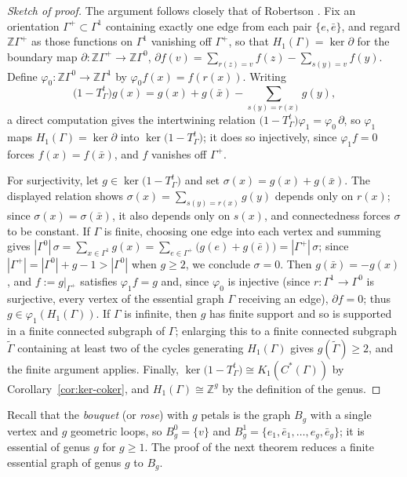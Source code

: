 \documentclass[12pt,reqno]{amsart}
\theoremstyle{plain}
\theoremstyle{definition}
\newcommand{\Z}{\mathbb{Z}}
\begin{document}
\begin{proof}[Sketch of proof]
The argument follows closely that of Robertson \cite{Robertson}. Fix an orientation
$\Gamma^+\subset\Gamma^1$ containing exactly one edge from each pair $\{e,\bar e\}$, and regard
$\Z\Gamma^+$ as those functions on $\Gamma^1$ vanishing off $\Gamma^+$, so that
$H_1(\Gamma)=\ker\partial$ for the boundary map $\partial\colon\Z\Gamma^+\to\Z\Gamma^0$,
$\partial f(v)=\sum_{r(z)=v}f(z)-\sum_{s(y)=v}f(y)$. Define
$\varphi_0\colon\Z\Gamma^0\to\Z\Gamma^1$ by $\varphi_0f(x)=f(r(x))$. Writing
\[
\big(1-T_\Gamma^{t}\big)g(x)=g(x)+g(\bar x)-\sum_{s(y)=r(x)}g(y),
\]
a direct computation gives the intertwining relation
$\big(1-T_\Gamma^{t}\big)\varphi_1=\varphi_0\,\partial$, so $\varphi_1$ maps
$H_1(\Gamma)=\ker\partial$ into $\ker\big(1-T_\Gamma^{t}\big)$; it does so injectively, since
$\varphi_1f=0$ forces $f(x)=f(\bar x)$, and $f$ vanishes off $\Gamma^+$.

For surjectivity, let $g\in\ker\big(1-T_\Gamma^{t}\big)$ and set $\sigma(x)=g(x)+g(\bar x)$. The
displayed relation shows $\sigma(x)=\sum_{s(y)=r(x)}g(y)$ depends only on $r(x)$; since
$\sigma(x)=\sigma(\bar x)$, it also depends only on $s(x)$, and connectedness forces $\sigma$ to be
constant. If $\Gamma$ is finite, choosing one edge into each vertex and summing gives
$|\Gamma^0|\,\sigma=\sum_{x\in\Gamma^1}g(x)=\sum_{e\in\Gamma^+}\big(g(e)+g(\bar
e)\big)=|\Gamma^+|\,\sigma$; since $|\Gamma^+|=|\Gamma^0|+g-1>|\Gamma^0|$ when $g\ge 2$, we conclude
$\sigma=0$. Then $g(\bar x)=-g(x)$, and $f:=g|_{\Gamma^+}$ satisfies $\varphi_1f=g$ and, since
$\varphi_0$ is injective \textup(since $r\colon\Gamma^1\to\Gamma^0$ is surjective, every vertex of
the essential graph $\Gamma$ receiving an edge\textup), $\partial f=0$; thus
$g\in\varphi_1(H_1(\Gamma))$. If $\Gamma$ is
infinite, then $g$ has finite support and so is supported in a finite connected subgraph of
$\Gamma$; enlarging this to a finite connected subgraph $\widetilde\Gamma$ containing at least two
of the cycles generating $H_1(\Gamma)$ gives $g(\widetilde\Gamma)\ge 2$, and the finite argument
applies. Finally, $\ker\big(1-T_\Gamma^{t}\big)\cong K_1(C^*(\Gamma))$ by
Corollary~\ref{cor:ker-coker}, and $H_1(\Gamma)\cong\Z^{g}$ by the definition of the genus.
\end{proof}

Recall that the \emph{bouquet} (or \emph{rose}) with $g$ petals is the graph $B_g$ with a single
vertex and $g$ geometric loops, so $B_g^0=\{v\}$ and $B_g^1=\{e_1,\bar e_1,\dots,e_g,\bar e_g\}$;
it is essential of genus $g$ for $g\ge 1$. The proof of the next theorem reduces a finite essential
graph of genus $g$ to $B_g$.
\end{document}
